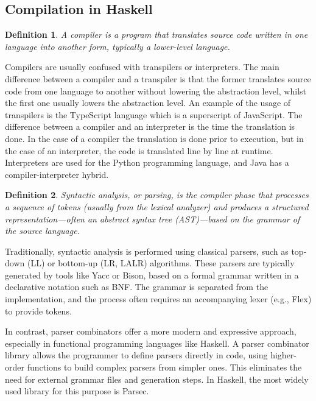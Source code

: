 \documentclass[12pt]{article}
\newtheorem{definition}{Definition}
\begin{document}
    \subsection{Compilation in Haskell}
        \begin{definition}
            A compiler is a program that translates source code written in one language into another form, typically a lower-level language.
        \end{definition}
        Compilers are usually confused with transpilers or interpreters. 
        The main difference between a compiler and a transpiler is that the former translates source code from one language to another without lowering the abstraction level, whilst the first one usually lowers the abstraction level. An example of the usage of transpilers is the TypeScript language which is a superscript of JavaScript.
        The difference between a compiler and an interpreter is the time the translation is done. In the case of a compiler the translation is done prior to execution, but in the case of an interpreter, the code is translated line by line at runtime. Interpreters are used for the Python programming language, and Java has a compiler-interpreter hybrid.
        \cite{alfred2007compilers}
        \begin{definition}
            Syntactic analysis, or parsing, is the compiler phase that processes a sequence of tokens (usually from the lexical analyzer) and produces a structured representation—often an abstract syntax tree (AST)—based on the grammar of the source language.
        \end{definition}
        
        Traditionally, syntactic analysis is performed using classical parsers, such as top-down (LL) or bottom-up (LR, LALR) algorithms. These parsers are typically generated by tools like Yacc or Bison, based on a formal grammar written in a declarative notation such as BNF. The grammar is separated from the implementation, and the process often requires an accompanying lexer (e.g., Flex) to provide tokens.
        \cite{alfred2007compilers}

        In contrast, parser combinators offer a more modern and expressive approach, especially in functional programming languages like Haskell. A parser combinator library allows the programmer to define parsers directly in code, using higher-order functions to build complex parsers from simpler ones. This eliminates the need for external grammar files and generation steps. In Haskell, the most widely used library for this purpose is Parsec.
        
\end{document}
